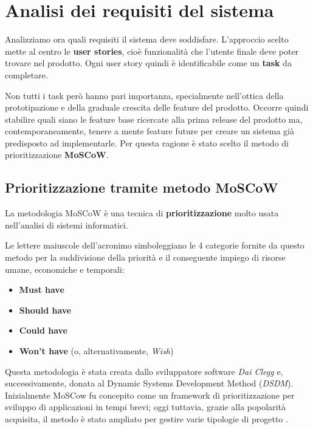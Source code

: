 \section{Analisi dei requisiti del sistema}
Analizziamo ora quali requisiti il sistema deve soddisfare.\newline
L'approccio scelto mette al centro le {\bf user stories}, cioè funzionalità che l'utente finale deve poter trovare nel prodotto.\newline
Ogni user story quindi è identificabile come un {\bf task} da completare.\newline

\noindent Non tutti i task però hanno pari importanza, specialmente nell'ottica della prototipazione e della graduale crescita delle feature del prodotto.\newline
Occorre quindi stabilire quali siano le feature base ricercate alla prima release del prodotto ma, contemporaneamente, tenere a mente feature future per creare un sistema già predisposto ad implementarle.\newline
Per questa ragione è stato scelto il metodo di prioritizzazione {\bf MoSCoW}.
\subsection{Prioritizzazione tramite metodo MoSCoW}
La metodologia MoSCoW è una tecnica di {\bf prioritizzazione} molto usata nell'analisi di sistemi informatici.\newline

\noindent Le lettere maiuscole dell'acronimo simboleggiano le 4 categorie fornite da questo metodo per la suddivisione della priorità e il conseguente impiego di risorse umane, economiche e temporali:
\begin{itemize}
  \item {\bf Must have}
  \item {\bf Should have}
  \item {\bf Could have}
  \item {\bf Won't have} (o, alternativamente, \emph{Wish})
\end{itemize}

\noindent Questa metodologia è stata creata dallo sviluppatore software \emph{Dai Clegg} e, successivamente, donata al Dynamic Systems Development Method (\emph{DSDM}).\newline
Inizialmente MoSCow fu concepito come un framework di prioritizzazione per sviluppo di applicazioni in tempi brevi; oggi tuttavia, grazie alla popolarità acquisita, il metodo è stato ampliato per gestire varie tipologie di progetto \cite{moscow}.
